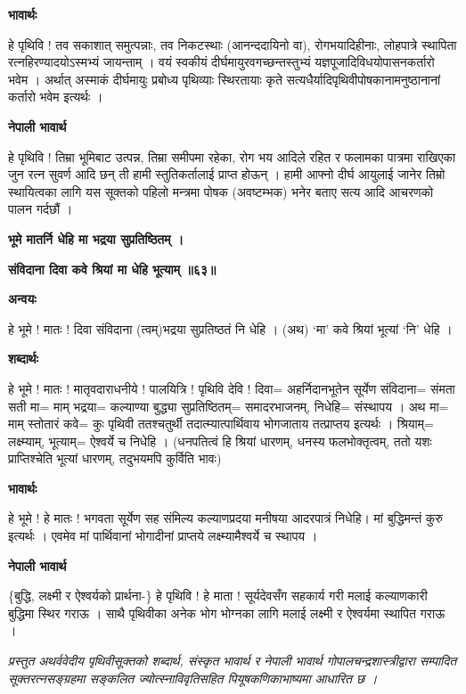 \documentclass[11pt, a5paper]{article}
\begin{document}
\textbf{भावार्थः}

हे पृथिवि ! तव सकाशात् समुत्पन्नाः, तव निकटस्थाः (आनन्ददायिनो वा), रोगभयादिहीनाः, लोहपात्रे स्थापिता रत्नहिरण्यादयोऽस्मभ्यं जायन्ताम् । वयं स्वकीयं दीर्घमायुरवगच्छन्तस्तुभ्यं यज्ञपूजादिविधयोपासनकर्तारो भवेम । अर्थात् अस्माकं दीर्घमायुः प्रबोध्य पृथिव्याः स्थिरतायाः कृते सत्यधैर्यादिपृथिवीपोषकानामनुष्ठानानां कर्तारो भवेम इत्यर्थः ।

\textbf{नेपाली भावार्थ}

हे  पृथिवि ! तिम्रा भूमिबाट उत्पन्न, तिम्रा समीपमा रहेका, रोग भय आदिले रहित र फलामका पात्रमा राखिएका जुन रत्न सुवर्ण आदि छन् ती हामी स्तुतिकर्तालाई प्राप्त होऊन् । हामी आफ्नो दीर्घ आयुलाई जानेर तिम्रो स्थायित्वका लागि यस सूक्तको पहिलो मन्त्रमा पोषक (अवष्टम्भक) भनेर बताए सत्य आदि आचरणको पालन गर्दछौं ।

\textbf{भूमे मातर्नि धेहि मा भद्रया सुप्रतिष्ठितम् ।}

\textbf{संविदाना दिवा कवे श्रियां मा धेहि भूत्याम् ॥६३॥}

\textbf{अन्वयः}

हे भूमे ! मातः !  दिवा संविदाना (त्वम्)भद्रया सुप्रतिष्ठतं नि धेहि । (अथ) ‘मा’ कवे श्रियां भूत्यां ‘नि’ धेहि ।

\textbf{शब्दार्थः}

हे भूमे ! मातः ! मातृवदाराधनीये ! पालयित्रि ! पृथिवि देवि ! दिवा= अहर्निदानभूतेन सूर्येण संविदाना= संमता सती मा= माम् भद्रया= कल्याण्या बुद्ध्या सुप्रतिष्ठितम्= समादरभाजनम्, निधेहि= संस्थापय । अथ मा= माम् स्तोतारं कवे= कुः पृथिवी ततश्चतुर्थी तदात्म्यात्पार्थिवाय भोगजाताय तत्प्राप्तय इत्यर्थः । श्रियाम्= लक्ष्म्याम्, भूत्याम्= ऐश्वर्ये च निधेहि । (धनपतित्वं हि श्रियां धारणम्, धनस्य फलभोक्तृत्वम्, ततो यशः प्राप्तिश्चेति भूत्यां धारणम्, तदुभयमपि कुर्विति भावः)

\textbf{भावार्थः}

हे भूमे !  हे मातः ! भगवता सूर्येण सह संमिल्य कल्याणप्रदया मनीषया आदरपात्रं निधेहि। मां बुद्धिमन्तं कुरु इत्यर्थः । एवमेव मां पार्थिवानां भोगादीनां प्राप्तये लक्ष्म्यामैश्वर्ये च स्थापय ।

\textbf{नेपाली भावार्थ}

\{बुद्धि, लक्ष्मी र ऐश्वर्यको प्रार्थना-\} हे पृथिवि ! हे माता ! सूर्यदेवसँग सहकार्य गरी मलाई कल्याणकारी बुद्धिमा स्थिर गराऊ । साथै पृथिवीका अनेक भोग भोग्नका लागि मलाई लक्ष्मी र ऐश्वर्यमा स्थापित गराऊ ।

\textit{प्रस्तुत अथर्ववेदीय पृथिवीसूक्तको शब्दार्थ, संस्कृत भावार्थ र नेपाली भावार्थ गोपालचन्द्रशास्त्रीद्वारा सम्पादित सूक्तरत्नसङ्‌ग्रहमा सङ्कलित ज्योत्स्नाविवृतिसहित पियूषकणिकाभाष्यमा आधारित छ ।}
\end{document}
